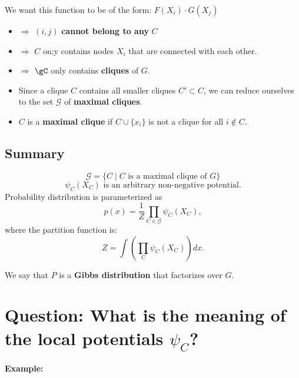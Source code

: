 \documentclass{article}%
\begin{document}
We want this function to be of the form:
\(
F(X_i) \cdot G(X_j)
\)

\begin{itemize}

\item $\Rightarrow$ \( (i,j) \) \textbf{cannot belong to any} \( C \)

\item $\Rightarrow$ $C$ on;y contains nodes $X_i$ that are connected with each other.

\item $\Rightarrow$ $\gC$ only contains \textbf{cliques} of \( G \).

    \item Since a clique \( C \) contains all smaller cliques \( C' \subset C \), we can reduce ourselves to the set \( \mathcal{G} \) of \textbf{maximal cliques}.
    \item \( C \) is a \textbf{maximal clique} if \( C \cup \{ x_i \} \) is not a clique for all \( i \notin C \).
\end{itemize}

\subsection*{Summary}
\[
\mathcal{G} = \{ C \mid C \text{ is a maximal clique of } G \}
\]
\[
\psi_C(X_C) \text{ is an arbitrary non-negative potential.}
\]
Probability distribution is parameterized as 
\[
p(x) = \frac{1}{Z} \prod_{C \in \mathcal{G}} \psi_C (X_C),
\]
where the partition function is:
\[
Z = \int \left( \prod_C \psi_C (X_C) \right) dx.
\]

We say that \( P \) is a \textbf{Gibbs distribution} that factorizes over \( G \).

\section*{Question: What is the meaning of the local potentials \( \psi_C \)?}

\textbf{Example:}

\begin{center}
\end{center}
\end{document}

